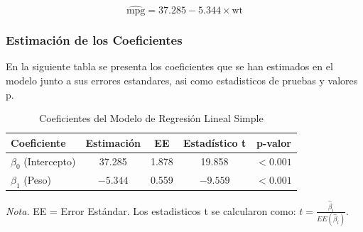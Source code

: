 \documentclass[12pt, letterpaper]{article}
\begin{document}
    \begin{equation}
        \widehat{\text{mpg}} = 37.285 - 5.344 \times \text{wt}
        \label{eq:modelo}
    \end{equation}

    \subsubsection{Estimación de los Coeficientes}

    En la siguiente tabla se presenta los coeficientes que se han estimados en el modelo junto a sus errores estandares, asi como estadisticos de pruebas y valores p.

    \begin{table}[H]
        \centering
        \caption{Coeficientes del Modelo de Regresión Lineal Simple}
        \begin{tabular}{@{}lcccc@{}}
            \toprule 
            \textbf{Coeficiente}       & \textbf{Estimación} & \textbf{EE} & \textbf{Estadístico t} & \textbf{p-valor} \\
            \midrule 
            $\beta_{0}$ (Intercepto)   & 37.285              & 1.878       & 19.858                 & $< 0.001$        \\
            $\beta_{1}$ (Peso)         & $-5.344$            & 0.559       & $-9.559$               & $< 0.001$        \\
            \bottomrule
        \end{tabular}
        \label{tab:regresion}
        
        \vspace{0.2cm}
        \textit{Nota.} EE = Error Estándar. Los estadisticos t se calcularon como: $t = \frac{\hat{\beta}_i}{EE(\hat{\beta}_i)}$.
    \end{table}
\end{document}
